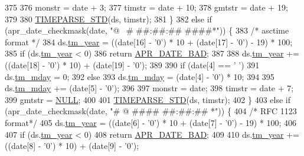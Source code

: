 \begin{DoxyCode}
375 
376         monstr = date + 3;
377         timstr = date + 10;
378         gmtstr = date + 19;
379 
380         \hyperlink{apr__date_8c_a574f7cc7ba24c017bff5d6c41cf5903d}{TIMEPARSE\_STD}(ds, timstr);
381     \}
382     \textcolor{keywordflow}{else} \textcolor{keywordflow}{if} (apr\_date\_checkmask(date, \textcolor{stringliteral}{"@$$ ~# ##:##:## ####*"})) \{
383         \textcolor{comment}{/* asctime format */}
384         ds.\hyperlink{structapr__time__exp__t_a35c32245be49279a6689e34bcd6e534a}{tm\_year} = ((date[16] - \textcolor{charliteral}{'0'}) * 10 + (date[17] - \textcolor{charliteral}{'0'}) - 19) * 100;
385         \textcolor{keywordflow}{if} (ds.\hyperlink{structapr__time__exp__t_a35c32245be49279a6689e34bcd6e534a}{tm\_year} < 0) 
386             \textcolor{keywordflow}{return} \hyperlink{group__APR__Util__Date_ga8be88b25f4b477ad13c4067c959411b0}{APR\_DATE\_BAD};
387 
388         ds.\hyperlink{structapr__time__exp__t_a35c32245be49279a6689e34bcd6e534a}{tm\_year} += ((date[18] - \textcolor{charliteral}{'0'}) * 10) + (date[19] - \textcolor{charliteral}{'0'});
389 
390         \textcolor{keywordflow}{if} (date[4] == \textcolor{charliteral}{' '})
391             ds.\hyperlink{structapr__time__exp__t_a6c09a274f011841e9e988c3c9504848a}{tm\_mday} = 0;
392         \textcolor{keywordflow}{else}
393             ds.\hyperlink{structapr__time__exp__t_a6c09a274f011841e9e988c3c9504848a}{tm\_mday} = (date[4] - \textcolor{charliteral}{'0'}) * 10;
394 
395         ds.\hyperlink{structapr__time__exp__t_a6c09a274f011841e9e988c3c9504848a}{tm\_mday} += (date[5] - \textcolor{charliteral}{'0'});
396 
397         monstr = date;
398         timstr = date + 7;
399         gmtstr = \hyperlink{pcre_8txt_ad7f989d16aa8ca809a36bc392c07fba1}{NULL};
400 
401         \hyperlink{apr__date_8c_a574f7cc7ba24c017bff5d6c41cf5903d}{TIMEPARSE\_STD}(ds, timstr);
402     \}
403     \textcolor{keywordflow}{else} \textcolor{keywordflow}{if} (apr\_date\_checkmask(date, \textcolor{stringliteral}{"# @$$ #### ##:##:## *"})) \{
404         \textcolor{comment}{/* RFC 1123 format*/}
405         ds.\hyperlink{structapr__time__exp__t_a35c32245be49279a6689e34bcd6e534a}{tm\_year} = ((date[6] - \textcolor{charliteral}{'0'}) * 10 + (date[7] - \textcolor{charliteral}{'0'}) - 19) * 100;
406 
407         \textcolor{keywordflow}{if} (ds.\hyperlink{structapr__time__exp__t_a35c32245be49279a6689e34bcd6e534a}{tm\_year} < 0)
408             \textcolor{keywordflow}{return} \hyperlink{group__APR__Util__Date_ga8be88b25f4b477ad13c4067c959411b0}{APR\_DATE\_BAD};
409 
410         ds.\hyperlink{structapr__time__exp__t_a35c32245be49279a6689e34bcd6e534a}{tm\_year} += ((date[8] - \textcolor{charliteral}{'0'}) * 10) + (date[9] - \textcolor{charliteral}{'0'});

\end{DoxyCode}
